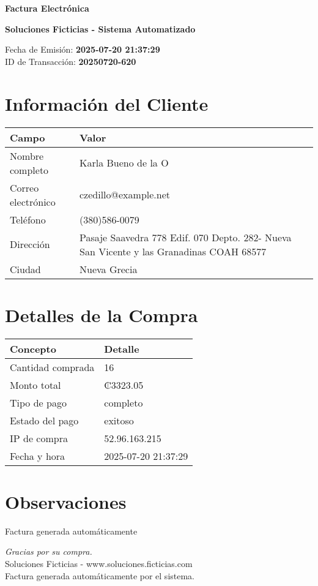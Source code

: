 \documentclass[12pt]{article}
\begin{document}
\begin{center}
    \Huge \textbf{Factura Electrónica}

    \vspace{0.3cm}
    \large \textbf{Soluciones Ficticias - Sistema Automatizado}

    \vspace{0.5cm}
    \normalsize Fecha de Emisión: \textbf{2025-07-20 21:37:29} \\
    ID de Transacción: \textbf{20250720-620} \\
\end{center}

\vspace{1cm}

\section*{Información del Cliente}
\begin{tabularx}{\textwidth}{L{4cm} L{12cm}}
\textbf{Campo} & \textbf{Valor} \\
\hline
Nombre completo & Karla Bueno de la O \\
Correo electrónico & czedillo@example.net \\
Teléfono & (380)586-0079 \\
Dirección & Pasaje Saavedra 778 Edif. 070   Depto. 282- Nueva San Vicente y las Granadinas  COAH 68577 \\
Ciudad & Nueva Grecia \\
\end{tabularx}

\vspace{0.8cm}

\section*{Detalles de la Compra}
\begin{tabularx}{\textwidth}{L{6cm} L{10cm}}
\textbf{Concepto} & \textbf{Detalle} \\
\hline
Cantidad comprada & 16 \\
Monto total & ₡3323.05 \\
Tipo de pago & completo \\
Estado del pago & exitoso \\
IP de compra & 52.96.163.215 \\
Fecha y hora & 2025-07-20 21:37:29 \\
\end{tabularx}

\vspace{1.5cm}

\section*{Observaciones}
Factura generada automáticamente

\vfill

\begin{center}
    \textit{Gracias por su compra.} \\
    Soluciones Ficticias - www.soluciones.ficticias.com \\
    Factura generada automáticamente por el sistema.
\end{center}
\end{document}
